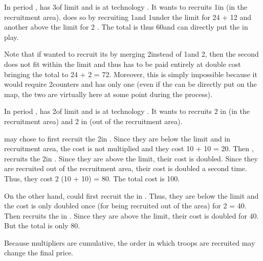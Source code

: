 \begin{exemple}
  In period , \POR has 3\LD of limit and is at technology \TREN. It
  wants to recruits 1\ARMY\Faceplus in \provinceTejo (in the recruitment
  area). \POR does so by recruiting 1\ARMY\Facemoins and 1\LD under the limit
  for 24 + 12 \ducats and another \LD above the limit for 2 \ducats. The total is thus 60\ducats and \POR can directly put the
  \ARMY\Faceplus in play.

  Note that if \POR wanted to recruit its \ARMY\Faceplus by merging
  2\ARMY\Facemoins instead of 1\ARMY\Facemoins and 2\LD, then the second
  \ARMY\Facemoins does not fit within the limit and thus has to be paid
  entirely at double cost bringing the total to 24 + 2  =
  72\ducats. Moreover, this is simply impossible because it would require
  2\ARMY counters and \POR has only one (even if the \ARMY\Faceplus can be
  directly put on the map, the two \ARMY\Facemoins are virtually here at some
  point during the process).
\end{exemple}

\begin{exemple}
  In period , \POR has 2\LD of limit and is at technology \TMED. It
  wants to recruits 2 \LD in \provinceTejo (in the recruitment area) and 2 in
  \provinceTanger (out of the recruitment area).

  \POR may chose to first recruit the 2\LD in \provinceTejo. Since they are
  below the limit and in recruitment area, the cost is not multiplied and they
  cost 10 + 10 = 20\ducats. Then , \POR recruits the 2\LD in
  \provinceTanger. Since they are above the limit, their cost is
  doubled. Since they are recruited out of the recruitment area, their cost is
  doubled a second time. Thus, they cost 2  \textmultiply (10 +
  10) = 80\ducats. The total cost is 100\ducats.

  On the other hand, \POR could first recruit the \LD in
  \provinceTanger. Thus, they are below the limit and the cost is only doubled
  once (for being recruited out of the area) for 2  =
  40\ducats. Then \POR recruits the \LD in \provinceTejo. Since they are above
  the limit, their cost is doubled for 40\ducats. But the total is only
  80\ducats.

  Because multipliers are cumulative, the order in which troops are recruited
  may change the final price.
\end{exemple}

